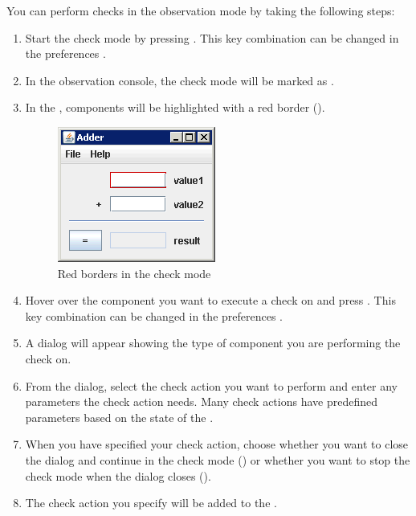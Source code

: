 You can perform checks in the observation mode by taking the following steps:
\begin{enumerate}
\item Start the check mode by pressing . This key combination can be changed in the preferences . 
\item In the observation console, the check mode will be marked as . 
\item In the \gdaut{}, components will be highlighted with a red border ().

\begin{figure}[h]
\begin{center}
\includegraphics{Tasks/Recording/PS/redborders}
\caption{Red borders in the check  mode}
\label{redborders}
\end{center}
\end{figure}
 
\item Hover over the component you want to execute a check on and press . This key combination can be changed in the preferences . 
\item A dialog will appear showing the type of component you are performing the check on. 
\item From the dialog, select the check action you want to perform and enter any parameters the check action needs. Many check actions have predefined parameters based on the state of the \gdaut{}. 
\item When you have specified your check action, choose whether you want to close the dialog and continue in the check mode () or whether you want to stop the check mode when the dialog closes (). 
\item The check action you specify will be added to the \gdtestcaseeditor{}. 
\end{enumerate}




  


